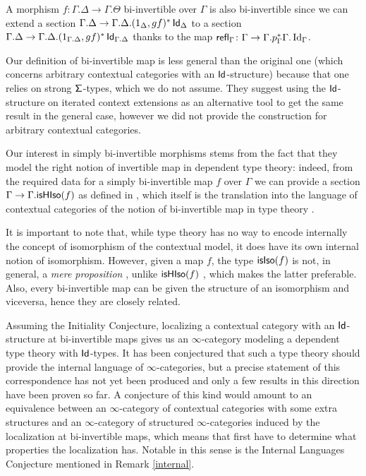 \begin{rmk}
  A morphism $f\colon\Gamma.\Delta\rightarrow\Gamma.\Theta$ bi-invertible over
  $\Gamma$ is also bi-invertible since we can extend a section
  $\Gamma.\Delta\rightarrow\Gamma.\Delta.(1_\Delta,gf)^*\operatorname{\mathsf{Id}}_\Delta$
  to a section
  $\Gamma.\Delta\rightarrow\Gamma.\Delta.(1_{\Gamma.\Delta},gf)^*\operatorname{\mathsf{Id}}_{\Gamma.\Delta}$
  thanks to the map
  $\operatorname{\mathsf{refl}}_\Gamma\colon\Gamma\rightarrow\Gamma.p^*_\Gamma\Gamma.\operatorname{Id}_\Gamma$.
\end{rmk}

\begin{rmk}
  Our definition of bi-invertible map is less general than the original one
  (which concerns arbitrary contextual categories with an $\operatorname{\mathsf{Id}}$-structure)
  because that one relies on strong $\operatorname{\mathsf{\Sigma}}$-types, which we do not assume.
  They suggest using the $\operatorname{\mathsf{Id}}$-structure on iterated context extensions
  as an alternative tool to get the same result in the general case, however we
  did not provide the construction for arbitrary contextual categories.
\end{rmk}

\begin{rmk}
  Our interest in simply bi-invertible morphisms stems from the fact that they
  model the right notion of invertible map in dependent type theory: indeed,
  from the
  required data for a simply bi-invertible map $f$ over $\Gamma$ we can provide
  a section $\Gamma\rightarrow\Gamma.\mathsf{isHIso}({f})$ 
  as defined in \cite[Def.~B.3.3]{KL12}, which itself is the translation into
  the language of contextual categories of the notion of bi-invertible map in
  type theory \cite[Def~4.3.1]{Uni13}.

  It is important to note that, while type theory has no way to encode
  internally the concept of isomorphism of the contextual model, it does have
  its own internal notion of isomorphism. However, given a map $f$, the type
  $\mathsf{isIso}({f})$ is not, in general, a \emph{mere proposition}
  \cite[Def.~3.3.1]{Uni13}, unlike $\mathsf{isHIso}({f})$
  \cite[Thm.~4.3.2]{Uni13}, which makes the latter
  preferable. Also, every bi-invertible map can be given the structure of an
  isomorphism and viceversa, hence they are closely related.
\end{rmk}

\begin{rmk}
Assuming the Initiality Conjecture, localizing a contextual category with an
$\operatorname{\mathsf{Id}}$-structure at bi-invertible maps gives us an $\infty$-category modeling a
dependent type theory with $\operatorname{\mathsf{Id}}$-types. It has been conjectured that such a
type theory should provide the internal language of $\infty$-categories, but a
precise statement of this correspondence has not yet been produced and only a
few results in this direction have been proven so far. A conjecture of this kind
would amount to an equivalence between an $\infty$-category of contextual
categories with some extra structures and an $\infty$-category of structured
$\infty$-categories induced by the localization at bi-invertible maps, which
means that first have to determine what properties the localization has. Notable
in this sense is the Internal Languages Conjecture mentioned in Remark
\ref{internal}.
\end{rmk}

